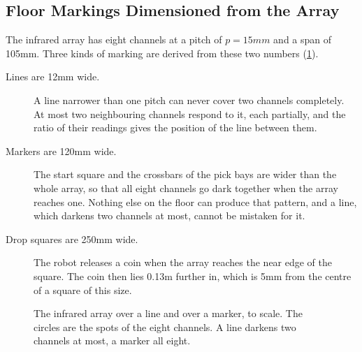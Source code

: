 \subsection{Floor Markings Dimensioned from the Array}
\label{sec:markings}
The infrared array has eight channels at a pitch of $p=15\unit{mm}$ and a span of
105\unit{mm}. Three kinds of marking are derived from these two numbers (\cref{fig:markings}).
\begin{description}
  \item[Lines are 12\unit{mm} wide.] A line narrower than one pitch can never cover two
        channels completely. At most two neighbouring channels respond to it, each
        partially, and the ratio of their readings gives the position of the line between
        them.
  \item[Markers are 120\unit{mm} wide.] The start square and the crossbars of the pick
        bays are wider than the whole array, so that all eight channels go dark together
        when the array reaches one. Nothing else on the floor can produce that pattern, and
        a line, which darkens two channels at most, cannot be mistaken for it.
  \item[Drop squares are 250\unit{mm} wide.] The robot releases a coin when the array
        reaches the near edge of the square. The coin then lies 0.13\unit{m} further in,
        which is 5\unit{mm} from the centre of a square of this size.
\end{description}

\begin{figure}[htbp]
  \centering
  \caption{The infrared array over a line and over a marker, to scale. The circles are the
  spots of the eight channels. A line darkens two channels at most, a marker all eight.}
  \label{fig:markings}
\end{figure}

